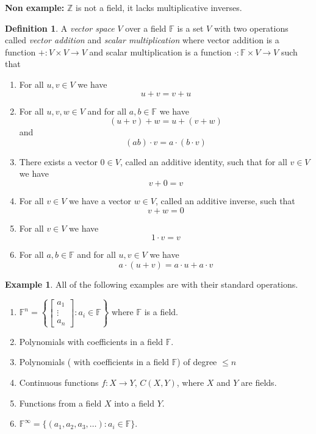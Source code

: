 \documentclass[12pt,letterpaper]{article}
\theoremstyle{plain}
\theoremstyle{definition}
\newtheorem{definition}[theorem]{Definition}
\newtheorem{example}[theorem]{Example}
\numberwithin{equation}{section}
\begin{document}
{\bf\noindent Non example: }$\mathbb{Z}$ is not a field, it lacks multiplicative inverses. 

\begin{definition} A \emph{vector space} $V$ over a field $\mathbb{F}$ is a set $V$ with two operations called \emph{vector addition} and \emph{scalar multiplication} where vector addition is a function $+:V\times V\rightarrow V$ and scalar multiplication is a function $\cdot: \mathbb{F}\times V\rightarrow V$ such that 
\\
\begin{enumerate}[1.] 
\setlength{\itemsep}{5pt}
\item For all $u,v\in V$ we have 
\[u+v=v+u\]
\item For all $u,v,w\in V$ and for all $a,b\in\mathbb{F}$ we have 
\[(u+v)+w=u+(v+w)\]
and 
\[(ab)\cdot v=a\cdot(b\cdot v)\]
\item There exists a vector $0\in V$, called an additive identity, such that for all $v\in V$ we have
\[v+0=v\]

\item For all $v\in V$ we have a vector $w\in V$, called an additive inverse, such that 
\[v+w=0\]
\item For all $v\in V$ we have 
\[1\cdot v=v\]
\item For all $a,b \in \mathbb{F}$ and for all $u,v\in V$ we have
\[a\cdot(u+v)=a\cdot u+a\cdot v\] 
\end{enumerate}
\end{definition}

\begin{example} All of the following examples are with their standard operations. 
\begin{enumerate}[1.]
\setlength{\itemsep}{5pt}
\item $\mathbb{F}^n=\left\{\begin{bmatrix}a_1\\ \vdots \\ a_n\end{bmatrix}: a_i\in \mathbb{F}\right\}$ where $\mathbb{F}$ is a field. 
\item Polynomials with coefficients in a field $\mathbb{F}$.
\item Polynomials ( with coefficients in a field $\mathbb{F}$) of degree $\leq n$
\item Continuous functions $f:X\rightarrow Y$, $C(X,Y)$, where $X$ and $Y$ are fields. 
\item Functions from a field $X$ into a field $Y$. 
\item $\mathbb{F}^\infty=\{(a_1, a_2, a_3, \ldots): a_i\in \mathbb{F}\}$. 
\end{enumerate}
\end{example}
\end{document}
